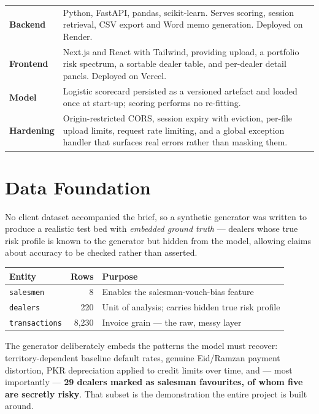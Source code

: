 \documentclass[11pt,a4paper]{article}
\newcommand{\lab}[1]{{\color{navy}\bfseries\footnotesize #1}}
\begin{document}
\vspace{-4pt}
\begin{tabularx}{\textwidth}{@{}p{3.1cm}X@{}}
\lab{Backend}    & Python, FastAPI, pandas, scikit-learn. Serves scoring, session
                   retrieval, CSV export and Word memo generation. Deployed on Render. \\
\lab{Frontend}   & Next.js and React with Tailwind, providing upload, a portfolio
                   risk spectrum, a sortable dealer table, and per-dealer detail
                   panels. Deployed on Vercel. \\
\lab{Model}      & Logistic scorecard persisted as a versioned artefact and loaded
                   once at start-up; scoring performs no re-fitting. \\
\lab{Hardening}  & Origin-restricted CORS, session expiry with eviction, per-file
                   upload limits, request rate limiting, and a global exception
                   handler that surfaces real errors rather than masking them. \\
\end{tabularx}

\section{Data Foundation}

No client dataset accompanied the brief, so a synthetic generator was written to
produce a realistic test bed with \emph{embedded ground truth} --- dealers whose
true risk profile is known to the generator but hidden from the model, allowing
claims about accuracy to be checked rather than asserted.

\begin{center}
\small
\begin{tabular}{@{}lrl@{}}
\toprule
\textbf{Entity} & \textbf{Rows} & \textbf{Purpose} \\
\midrule
\texttt{salesmen}      & 8      & Enables the salesman-vouch-bias feature \\
\texttt{dealers}       & 220    & Unit of analysis; carries hidden true risk profile \\
\texttt{transactions}  & 8{,}230 & Invoice grain --- the raw, messy layer \\
\bottomrule
\end{tabular}
\end{center}

The generator deliberately embeds the patterns the model must recover:
territory-dependent baseline default rates, genuine Eid/Ramzan payment
distortion, PKR depreciation applied to credit limits over time, and --- most
importantly --- \textbf{29 dealers marked as salesman favourites, of whom five
are secretly risky}. That subset is the demonstration the entire project is
built around.
\end{document}
